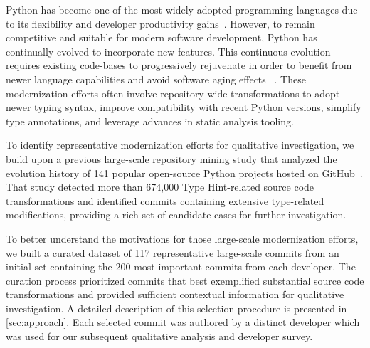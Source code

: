 
Python has become one of the most widely adopted programming languages due to its flexibility and developer productivity gains~\cite{chun2001core,dyer-fse:2022,malloy-emse:2019,7042702,DBLP:conf/usenix/Rossum07}. However, to remain competitive and suitable for modern software development, Python has continually evolved to incorporate new features. This continuous evolution requires existing code-bases to progressively rejuvenate in order to benefit from newer language capabilities and avoid software aging effects ~\cite{Lucas:jsp2024,Lucas:emse2025,Overbey:regrowing,Pirkelbauer:sc-rejuvenation}. These modernization efforts often involve repository-wide transformations to adopt newer typing syntax, improve compatibility with recent Python versions, simplify type annotations, and leverage advances in static analysis tooling.

To identify representative modernization efforts for qualitative investigation, we build upon a previous large-scale repository mining study that analyzed the evolution history of 141 popular open-source Python projects hosted on GitHub~\cite{refminer}. That study detected more than 674,000 Type Hint-related source code transformations and identified commits containing extensive type-related modifications, providing a rich set of candidate cases for further investigation.



To better understand the motivations for those large-scale modernization efforts, we built a curated dataset of 117 representative large-scale commits from an initial set containing the 200 most important commits from each developer. The curation process prioritized commits that best exemplified substantial source code transformations and provided sufficient contextual information for qualitative investigation. A detailed description of this selection procedure is presented in \ref{sec:approach}. Each selected commit was authored by a distinct developer which was used for our subsequent qualitative analysis and developer survey.

